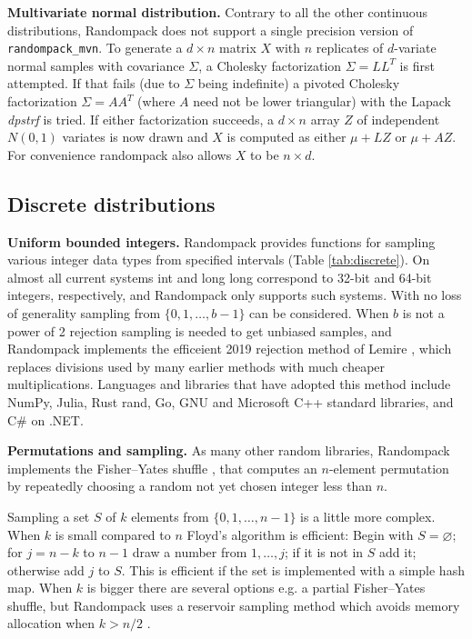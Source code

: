 \documentclass[manuscript,screen,review]{acmart}
\begin{document}
\textbf{Multivariate normal distribution.} Contrary to all the other
continuous distributions, Randompack does not support a single
precision version of \texttt{randompack\_mvn}. To generate a $d\times
n$ matrix $X$ with $n$ replicates of $d$-variate normal samples with
covariance $\Sigma$, a Cholesky factorization $\Sigma = LL^T$ is first
attempted. If that fails (due to $\Sigma$ being indefinite) a pivoted
Cholesky factorization $\Sigma=AA^T$ (where $A$ need not be lower
triangular) with the Lapack \emph{dpstrf} is tried. If either
factorization succeeds, a $d \times n$ array $Z$ of independent
$N(0,1)$ variates is now drawn and $X$ is computed as either $\mu +
LZ$ or $\mu + AZ$. For convenience randompack also allows $X$ to be
$n\times d$.

\subsection{Discrete distributions}
\textbf{Uniform bounded integers.} Randompack provides functions for
sampling various integer data types from specified intervals (Table
\ref{tab:discrete}). On almost all current systems int and long long
correspond to 32-bit and 64-bit integers, respectively, and Randompack
only supports such systems. With no loss of generality sampling from
$\{0,1,\ldots,b-1\}$ can be considered. When $b$ is not a power of 2
rejection sampling is needed to get unbiased samples, and Randompack
implements the efficeient 2019 rejection method of Lemire
\cite{lemire2019fastrandom}, which replaces divisions used by many
earlier methods with much cheaper multiplications. Languages and
libraries that have adopted this method include NumPy, Julia, Rust
rand, Go, GNU and Microsoft C++ standard libraries, and C\# on .NET.

\textbf{Permutations and sampling.} As many other random libraries,
Randompack implements the Fisher--Yates shuffle
\cite{fisher1938statistical,durstenfeld1964algorithm235}, that
computes an $n$-element permutation by repeatedly choosing a random
not yet chosen integer less than $n$.

Sampling a set $S$ of $k$ elements from $\{0,1,\ldots,n-1\}$ is a
little more complex. When $k$ is small compared to $n$ Floyd's
algorithm \cite{knuth1969art} is efficient: Begin with
$S=\varnothing$; for $j=n-k$ to $n-1$ draw a number from $1,\ldots,j$;
if it is not in $S$ add it; otherwise add $j$ to $S$. This is
efficient if the set is implemented with a simple hash map. When $k$
is bigger there are several options e.g. a partial Fisher--Yates
shuffle, but Randompack uses a reservoir sampling method which avoids
memory allocation when $k>n/2$ \cite{vitter1985reservoir}.
\end{document}

